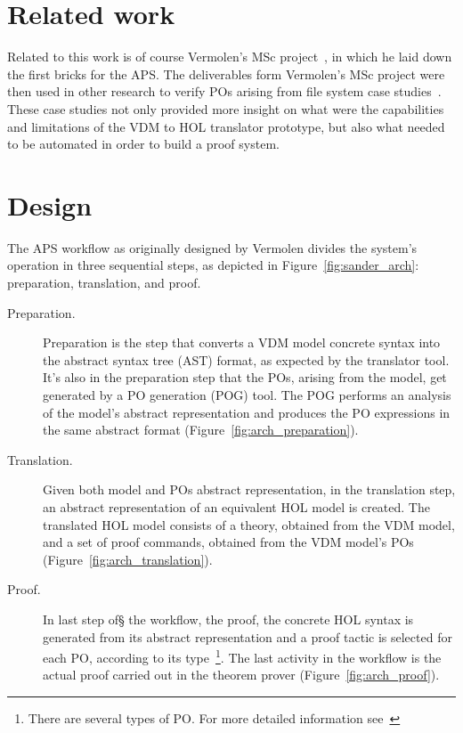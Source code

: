 \documentclass[]{article}
\begin{document}
\section{Related work}
\label{sec:related_work}

Related to this work is of course Vermolen's MSc project~\cite{Vermolen07}, in which he laid down the first bricks for the APS.
The deliverables form Vermolen's MSc project were then used in other research to verify POs arising from file system case studies~\cite{FerreiraSO2008,Ferreira2009,FerreiraSBMF09}.
These case studies not only provided more insight on what were the capabilities and limitations of the VDM to HOL translator prototype, but also what needed to be automated in order to build a proof system.

\section{Design}
\label{sec:intended_design}

%
%

The APS workflow as originally designed by Vermolen divides the system's operation in three sequential steps, as depicted in Figure~\ref{fig:sander_arch}: preparation, translation, and proof.

\begin{description}
  \item[Preparation.] Preparation is the step that converts a VDM model concrete syntax into the abstract syntax tree (AST) format, as expected by the translator tool.
	It's also in the preparation step that the POs, arising from the model, get generated by a PO generation (POG) tool.
	The POG performs an analysis of the model's abstract representation and produces the PO expressions in the same abstract format (Figure~\ref{fig:arch_preparation}).

  \item[Translation.] Given both model and POs abstract representation, in the translation step, an abstract representation of an equivalent HOL model is created. 
	The translated HOL model consists of a theory, obtained from the VDM model, and a set of proof commands, obtained from the VDM model's POs (Figure~\ref{fig:arch_translation}).

  \item[Proof.] In last step of§ the workflow, the proof, the concrete HOL syntax is generated from its abstract representation and a proof tactic is selected for each PO, according to its type~\footnote{There are several types of PO. For more detailed information see~\cite{CSK:2007lr}}. The last activity in the workflow is the actual proof carried out in the theorem prover (Figure~\ref{fig:arch_proof}).
\end{description}
\end{document}
